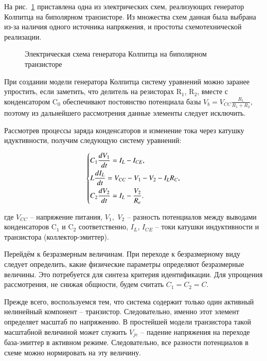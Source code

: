\documentclass[a4paper,12pt]{article}
\begin{document}
На рис.~\ref{atu:f:colp_schem} приставлена одна из электрических схем,
реализующих генератор Колпитца на биполярном транзисторе.
Из множества схем данная была выбрана из-за наличия
одного источника напряжения, и простоты схемотехнической реализации.


\begin{figure}[htb!]
\begin{center}

\end{center}
\caption{Электрическая схема генератора Колпитца на биполярном транзисторе}
\label{atu:f:colp_schem}
\end{figure}

При создании модели генератора Колпитца систему уравнений можно
заранее упростить, если заметить, что
делитель на резисторах
$\mathrm{R}_1$, $\mathrm{R}_2$,
вместе с конденсатором
$\mathrm{C}_0$ обеспечивают
постоянство потенциала базы
$V_b = V_{CC} \frac{R_1}{R_1+R_2}$,
поэтому из дальнейшего рассмотрения данные элементы следует
исключить.

Рассмотрев процессы заряда конденсаторов и изменение тока через
катушку идуктивности, получим следующую систему уравнений:

\begin{equation}
\label{atu:eq:colp_phys}
\begin{dcases}
  C_1 \frac{dV_{1}}{dt}  = I_L - I_{CE} , \\
  L   \frac{dI_L}{dt}    = V_{CC} - V_{1} - V_{2} - I_L R_C , \\
  C_2 \frac{dV_{2}}{dt}  = I_L - \frac{V_{2}}{R_e}.
\end{dcases}
\end{equation}


\noindent
где
$V_{CC} $ -- напряжение питания,
$V_1,$ $V_2$ -- разность потенциалов между выводами конденсаторов
$\mathrm{C}_1$ и $\mathrm{C}_2$ соответственно,
$I_L$, $I_{CE}$ -- токи катушки индуктивности и транзистора (коллектор-эмиттер).

Перейдём к безразмерным величинам.
При переходе к безразмерному виду следует определить,
какие физические параметры определяют безразмерные величины.
Это потребуется для синтеза критерия идентификации.
Для упрощения рассмотрения, не снижая общности,
будем считать $C_1 = C_2 = C$.

Прежде всего, воспользуемся тем, что система содержит только один
активный нелинейный компонент -- транзистор.
Следовательно, именно этот элемент определяет
масштаб по напряжению. В простейшей модели транзистора
такой масштабной величиной может служить
$V_{je}$ -- падение напряжения на переходе база-эмиттер
в активном режиме. Следовательно, все разности потенциалов в схеме можно нормировать
на эту величину.
\end{document}
